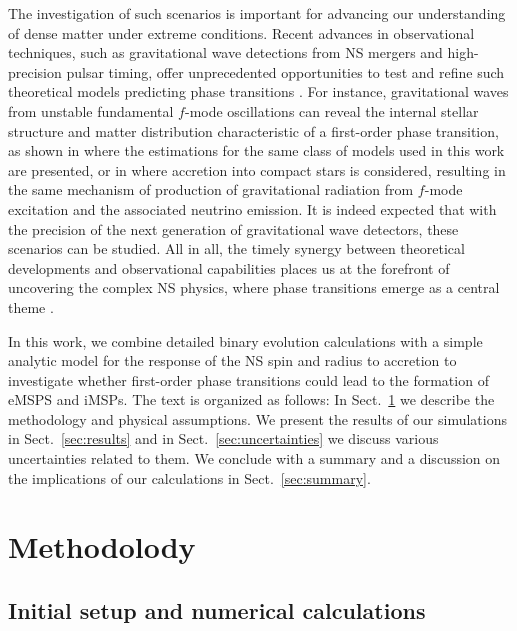 \documentclass[main.tex]{subfiles}
\begin{document}
        The investigation of such scenarios is important for advancing our understanding of dense matter under extreme conditions.  Recent advances in observational techniques, such as gravitational wave detections from NS mergers and high-precision pulsar timing, offer unprecedented opportunities to test and refine such theoretical models predicting phase transitions \citep[e.g.,][]{PhysRevLett.119.161101}.
        For instance, gravitational waves from unstable fundamental $f$-mode oscillations can reveal the internal stellar
        structure and matter distribution characteristic of a first-order phase transition, as shown in \cite{2023arXiv230908775K} 
        where the estimations for the same class of models used in this work are presented, or in \cite{2023arXiv231115992K} where
        accretion into compact stars is considered, resulting in the same mechanism of production of gravitational radiation from
        $f$-mode excitation and the associated neutrino emission. It is indeed expected that with the precision of the next generation of gravitational wave detectors, these scenarios can be studied. 
        All in all, the timely synergy between theoretical developments and observational capabilities places us at the forefront of uncovering the complex NS physics, where phase transitions emerge as a central theme \citep{Bauswein:2022vtq}.
        
        
        In this work, we combine detailed binary evolution calculations with a simple analytic model for the response of the NS spin and radius to accretion to investigate whether first-order phase transitions could lead to the formation of eMSPS and iMSPs. The text is organized as follows: In Sect.~\ref{sec:methods} we describe the methodology and physical assumptions. We present the results of our simulations in Sect.~\ref{sec:results} and in Sect.~\ref{sec:uncertainties} we discuss various uncertainties related to them. We conclude with a summary and a discussion on the implications of our calculations in Sect.~\ref{sec:summary}.
            

    \section{Methodolody} \label{sec:methods}
    
    \subsection{Initial setup and numerical calculations}\label{sec:setup}
    
\end{document}
